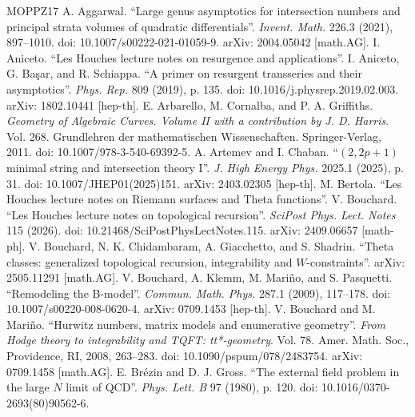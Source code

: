 \begin{thebibliography}{MOPPZ17}
 A. Aggarwal. ``Large genus asymptotics for intersection numbers and principal strata volumes of quadratic differentials''. \emph{Invent. Math.} 226.3 (2021), 897--1010. doi: 10.1007/s00222-021-01059-9. arXiv: 2004.05042 [math.AG].
 I. Aniceto. ``Les Houches lecture notes on resurgence and applications''.
 I. Aniceto, G. Ba\c{s}ar, and R. Schiappa. ``A primer on resurgent transseries and their asymptotics''. \emph{Phys. Rep.} 809 (2019), p. 135. doi: 10.1016/j.physrep.2019.02.003. arXiv: 1802.10441 [hep-th].
 E. Arbarello, M. Cornalba, and P. A. Griffiths. \emph{Geometry of Algebraic Curves. Volume II with a contribution by J. D. Harris}. Vol. 268. Grundlehren der mathematischen Wissenschaften. Springer-Verlag, 2011. doi: 10.1007/978-3-540-69392-5.
 A. Artemev and I. Chaban. ``$(2,2p+1)$ minimal string and intersection theory I''. \emph{J. High Energy Phys.} 2025.1 (2025), p. 31. doi: 10.1007/JHEP01(2025)151. arXiv: 2403.02305 [hep-th].
 M. Bertola. ``Les Houches lecture notes on Riemann surfaces and Theta functions''.
 V. Bouchard. ``Les Houches lecture notes on topological recursion''. \emph{SciPost Phys. Lect. Notes} 115 (2026). doi: 10.21468/SciPostPhysLectNotes.115. arXiv: 2409.06657 [math-ph].
 V. Bouchard, N. K. Chidambaram, A. Giacchetto, and S. Shadrin. ``Theta classes: generalized topological recursion, integrability and $W$-constraints''. arXiv: 2505.11291 [math.AG].
 V. Bouchard, A. Klemm, M. Mari\~no, and S. Pasquetti. ``Remodeling the B-model''. \emph{Commun. Math. Phys.} 287.1 (2009), 117--178. doi: 10.1007/s00220-008-0620-4. arXiv: 0709.1453 [hep-th].
 V. Bouchard and M. Mari\~no. ``Hurwitz numbers, matrix models and enumerative geometry''. \emph{From Hodge theory to integrability and TQFT: tt*-geometry}. Vol. 78. Amer. Math. Soc., Providence, RI, 2008, 263--283. doi: 10.1090/pspum/078/2483754. arXiv: 0709.1458 [math.AG].
 E. Br\'ezin and D. J. Gross. ``The external field problem in the large $N$ limit of QCD''. \emph{Phys. Lett. B} 97 (1980), p. 120. doi: 10.1016/0370-2693(80)90562-6.

\end{thebibliography}
